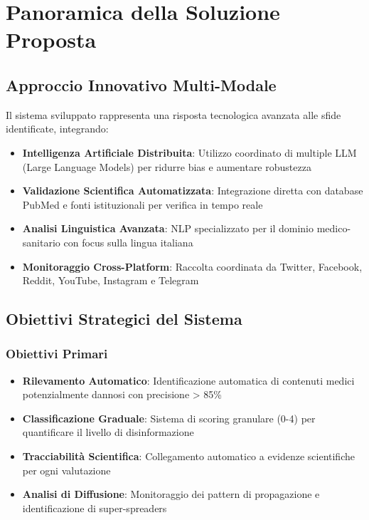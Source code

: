 \documentclass[12pt,a4paper]{report}
\begin{document}
\section{Panoramica della Soluzione Proposta}

\subsection{Approccio Innovativo Multi-Modale}

Il sistema sviluppato rappresenta una risposta tecnologica avanzata alle sfide identificate, integrando:

\begin{itemize}
    \item \textbf{Intelligenza Artificiale Distribuita}: Utilizzo coordinato di multiple LLM (Large Language Models) per ridurre bias e aumentare robustezza
    \item \textbf{Validazione Scientifica Automatizzata}: Integrazione diretta con database PubMed e fonti istituzionali per verifica in tempo reale
    \item \textbf{Analisi Linguistica Avanzata}: NLP specializzato per il dominio medico-sanitario con focus sulla lingua italiana
    \item \textbf{Monitoraggio Cross-Platform}: Raccolta coordinata da Twitter, Facebook, Reddit, YouTube, Instagram e Telegram
\end{itemize}

\subsection{Obiettivi Strategici del Sistema}

\subsubsection{Obiettivi Primari}

\begin{itemize}
    \item \textbf{Rilevamento Automatico}: Identificazione automatica di contenuti medici potenzialmente dannosi con precisione > 85\%
    \item \textbf{Classificazione Graduale}: Sistema di scoring granulare (0-4) per quantificare il livello di disinformazione
    \item \textbf{Tracciabilità Scientifica}: Collegamento automatico a evidenze scientifiche per ogni valutazione
    \item \textbf{Analisi di Diffusione}: Monitoraggio dei pattern di propagazione e identificazione di super-spreaders
\end{itemize}
\end{document}

